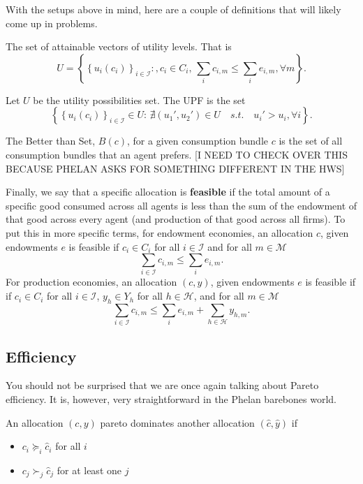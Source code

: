 \documentclass[11pt,english]{article}
\begin{document}
With the setups above in mind, here are a couple of definitions that will likely come up in problems.
\begin{definition}
The set of attainable vectors of utility levels. That is $$U = \left\{\left\{u_i(c_i)\right\}_{i\in \mathcal{I}}:, c_i\in C_i,\,\sum_i c_{i,m} \leq \sum_i e_{i,m}, \forall m\right\}.$$
\end{definition}
\begin{definition}
Let $U$ be the utility possibilities set. The UPF is the set $$\left\{\left\{u_i(c_i)\right\}_{i\in \mathcal{I}}\in U:\, \nexists(u_1', u_2')\in U\quad s.t.\quad u_i' > u_i, \forall i\right\}.$$
\end{definition}
\begin{definition}
The Better than Set, $B(c)$, for a given consumption bundle $c$ is the set of all consumption bundles that an agent prefers. [I NEED TO CHECK OVER THIS BECAUSE PHELAN ASKS FOR SOMETHING DIFFERENT IN THE HWS]
\end{definition}

Finally, we say that a specific allocation is \textbf{feasible} if the total amount of a specific good consumed across all agents is less than the sum of the endowment of that good across every agent (and production of that good across all firms). To put this in more specific terms, for endowment economies, an allocation $c$, given endowments $e$ is feasible if $c_i\in C_i$ for all $i\in \mathcal{I}$ and for all $m\in \mathcal{M}$ $$\sum_{i\in \mathcal{I}} c_{i,m} \leq \sum_i e_{i,m}.$$For production economies, an allocation $(c,y)$, given endowments $e$ is feasible if  if $c_i\in C_i$ for all $i\in \mathcal{I}$, $y_h\in Y_h$ for all $h\in \mathcal{H}$, and for all $m\in \mathcal{M}$ $$\sum_{i\in \mathcal{I}} c_{i,m} \leq \sum_i e_{i,m} + \sum_{h\in \mathcal{H}} y_{h,m}.$$

\subsection{Efficiency}
You should not be surprised that we are once again talking about Pareto efficiency. It is, however, very straightforward in the Phelan barebones world. 
\begin{definition}
An allocation $(c,y)$ pareto dominates another allocation $(\hat{c}, \hat{y})$ if 
\begin{itemize}
\item $c_i \succeq_i \hat{c}_i$ for all $i$
\item $c_j \succ_j \hat{c}_j$ for at least one $j$ 
\end{itemize}
\end{definition}
\end{document}
